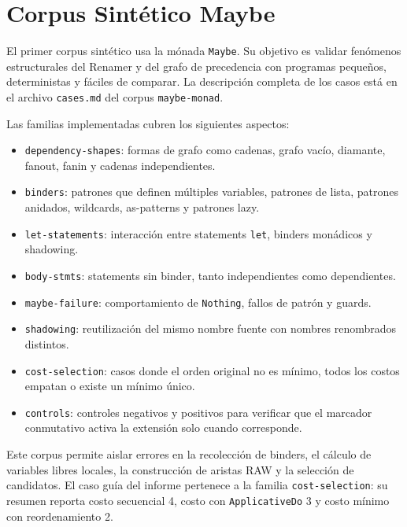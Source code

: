 
\section{Corpus Sintético Maybe}

El primer corpus sintético usa la mónada \texttt{Maybe}. Su objetivo es validar fenómenos estructurales del Renamer y del grafo de precedencia con programas pequeños, deterministas y fáciles de comparar. La descripción completa de los casos está en el archivo \texttt{cases.md} del corpus \texttt{maybe-monad}.

Las familias implementadas cubren los siguientes aspectos:

\begin{itemize}
    \item \texttt{dependency-shapes}: formas de grafo como cadenas, grafo vacío, diamante, fanout, fanin y cadenas independientes.
    \item \texttt{binders}: patrones que definen múltiples variables, patrones de lista, patrones anidados, wildcards, as-patterns y patrones lazy.
    \item \texttt{let-statements}: interacción entre statements \texttt{let}, binders monádicos y shadowing.
    \item \texttt{body-stmts}: statements sin binder, tanto independientes como dependientes.
    \item \texttt{maybe-failure}: comportamiento de \texttt{Nothing}, fallos de patrón y guards.
    \item \texttt{shadowing}: reutilización del mismo nombre fuente con nombres renombrados distintos.
    \item \texttt{cost-selection}: casos donde el orden original no es mínimo, todos los costos empatan o existe un mínimo único.
    \item \texttt{controls}: controles negativos y positivos para verificar que el marcador conmutativo activa la extensión solo cuando corresponde.
\end{itemize}

Este corpus permite aislar errores en la recolección de binders, el cálculo de variables libres locales, la construcción de aristas RAW y la selección de candidatos. El caso guía del informe pertenece a la familia \texttt{cost-selection}: su resumen reporta costo secuencial 4, costo con \texttt{ApplicativeDo} 3 y costo mínimo con reordenamiento 2.
